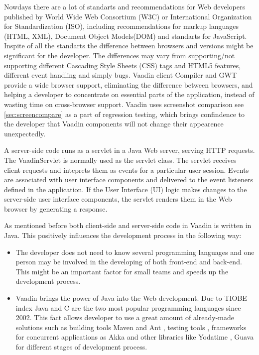    Nowdays there are a lot of standarts and recommendations for Web
   developers published by World Wide Web Consortium (W3C) or  International
   Organization for Standardization (ISO), including recommendations for
   markup languages (HTML, XML), Document Object Models(DOM) and standarts
   for JavaScript. Inspite of all the standarts the difference between browsers
   and versions might be significant for the developer. The differences may vary
   from supporting/not supporting different Cascading Style Sheets (CSS) tags
   and HTML5 features, different event handling and simply bugs. Vaadin client Compiler and GWT provide a wide browser
   support, eliminating the difference between browsers, and helping a
   developer to concentrate on essential parts of the application, instead of
   wasting time on cross-browser support. Vaadin uses screenshot comparison see
   \ref{sec:screencompare} as a part of regression testing, which brings
   confindence to the developer that Vaadin components will not change their
   appearence unexpectedly. 
   
   A server-side code runs as a servlet in a Java Web server, serving HTTP
   requests.
   The VaadinServlet is normally used as the servlet class. The servlet receives client requests
   and inteprets them as events for a particular user session.
   Events are associated with user interface components and delivered to the event listeners defined in the application.
   If the User Interface (UI) logic makes changes to the server-side user
   interface components, the servlet renders them in the Web browser by generating a response.
   
   As mentioned before both client-side and server-side code in Vaadin is written
   in Java. This positively influences the development process in the following
   way:
   \begin{itemize}
     \item The developer does not need to know several programming languages and one
    person may be involved in the developing of both front-end and back-end. This
    might be an important factor for small teams and speeds up the development
    process.
   \item Vaadin brings the power of Java into the Web development. Due to
    TIOBE index \cite{tiobeIndex} Java and C are the two most popular programming
    languages since 2002. This fact allows developer to use a great amount of
    already-made solutions such as building tools Maven \cite{maven} and Ant
    \cite{ant}, testing tools \cite{junit}, frameworks for concurrent
    applications as Akka \cite{akka} and other libraries like Yodatime \cite{yodatime}, Guava \cite{guava} for different stages of development
    process.
  \end{itemize}  		
		
